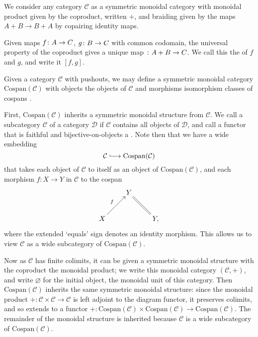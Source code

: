 We consider any category $\mathcal C$ as a symmetric monoidal category with
monoidal product given by the coproduct, written $+$, and braiding given by the
maps $A+B \to B+A$ by copairing identity maps. 

Given maps $f {\colon} A \to C$, $g {\colon} B \to C$ with common codomain, the
universal property of the coproduct gives a unique map ${\colon} A+B \to C$. We
call this the  of $f$ and $g$, and write it $[f,g]$. 

Given a category $\mathcal C$ with pushouts, we may define a symmetric monoidal
category $\mathrm{Cospan}(\mathcal C)$ with objects the objects of $\mathcal C$
and morphisms isomorphism classes of cospans \cite{Be}. 

  First, $\mathrm{Cospan(\mathcal C)}$ inherits a symmetric monoidal structure
  from $\mathcal C$. We call a subcategory $\mathcal C$ of a category $\mathcal
  D$  if $\mathcal C$ contains all objects of $\mathcal D$, and
  call a functor that is faithful and bijective-on-objects a . Note then that we have a wide embedding
  \[
    \mathcal C \hooklongrightarrow \mathrm{Cospan(\mathcal C)}
  \]
  that takes each object of $\mathcal C$ to itself as an object of
  $\mathrm{Cospan(\mathcal C)}$, and each morphism $f\colon  X \to Y$ in $\mathcal C$
  to the cospan
  \[
    \xymatrix{
      & Y \\
      X \ar[ur]^{f} && Y, \ar@{=}[ul]
    }
  \]
  where the extended `equals' sign denotes an identity morphism. This allows us
  to view $\mathcal C$ as a wide subcategory of $\mathrm{Cospan(\mathcal C)}$.

  Now as $\mathcal C$ has finite colimits, it can be given a symmetric monoidal
  structure with the coproduct the monoidal product; we write this monoidal
  category $(\mathcal C,+)$, and write $\varnothing$ for the initial object, the
  monoidal unit of this category. Then $\mathrm{Cospan(\mathcal C)}$ inherits
  the same symmetric monoidal structure: since the monoidal product $+\colon \mathcal
  C \times \mathcal C \to \mathcal C$ is left adjoint to the diagram functor, it
  preserves colimits, and so extends to a functor $+\colon
  \mathrm{Cospan(\mathcal C)} \times \mathrm{Cospan(\mathcal C)} \to
  \mathrm{Cospan(\mathcal C)}$. The remainder of the monoidal structure is
  inherited because $\mathcal C$ is a wide subcategory of
  $\mathrm{Cospan(\mathcal C)}$.

